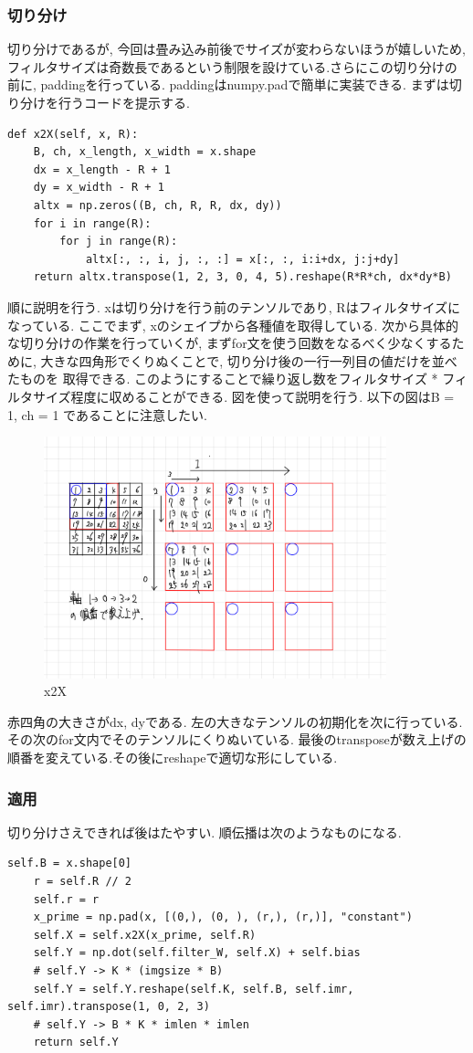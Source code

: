 \documentclass[a4paper,11pt]{jsarticle}
\begin{document}
\subsubsection{切り分け}
切り分けであるが, 今回は畳み込み前後でサイズが変わらないほうが嬉しいため, 
フィルタサイズは奇数長であるという制限を設けている.さらにこの切り分けの前に, paddingを行っている.
paddingはnumpy.padで簡単に実装できる.
まずは切り分けを行うコードを提示する.
\begin{lstlisting}[caption=x2X]
  def x2X(self, x, R):
    B, ch, x_length, x_width = x.shape
    dx = x_length - R + 1
    dy = x_width - R + 1
    altx = np.zeros((B, ch, R, R, dx, dy))
    for i in range(R):
        for j in range(R):
            altx[:, :, i, j, :, :] = x[:, :, i:i+dx, j:j+dy]
    return altx.transpose(1, 2, 3, 0, 4, 5).reshape(R*R*ch, dx*dy*B)
\end{lstlisting}
順に説明を行う. xは切り分けを行う前のテンソルであり, Rはフィルタサイズになっている.
ここでまず, xのシェイプから各種値を取得している. 次から具体的な切り分けの作業を行っていくが, 
まずfor文を使う回数をなるべく少なくするために, 大きな四角形でくりぬくことで, 切り分け後の一行一列目の値だけを並べたものを
取得できる. このようにすることで繰り返し数をフィルタサイズ * フィルタサイズ程度に収めることができる.
図を使って説明を行う. 以下の図はB = 1, ch = 1 であることに注意したい.
\begin{figure}[h]
  \centering
  \includegraphics[height = 7cm]{rep_conv.jpg}
  \caption{x2X}
\end{figure}
赤四角の大きさがdx, dyである. 左の大きなテンソルの初期化を次に行っている.
その次のfor文内でそのテンソルにくりぬいている.
最後のtransposeが数え上げの順番を変えている.その後にreshapeで適切な形にしている.

\subsubsection*{適用}
切り分けさえできれば後はたやすい. 順伝播は次のようなものになる.
\begin{lstlisting}[caption=convlution-prop]
  self.B = x.shape[0]
    r = self.R // 2
    self.r = r
    x_prime = np.pad(x, [(0,), (0, ), (r,), (r,)], "constant")
    self.X = self.x2X(x_prime, self.R)
    self.Y = np.dot(self.filter_W, self.X) + self.bias
    # self.Y -> K * (imgsize * B)
    self.Y = self.Y.reshape(self.K, self.B, self.imr, self.imr).transpose(1, 0, 2, 3)
    # self.Y -> B * K * imlen * imlen
    return self.Y
\end{lstlisting}
\end{document}
